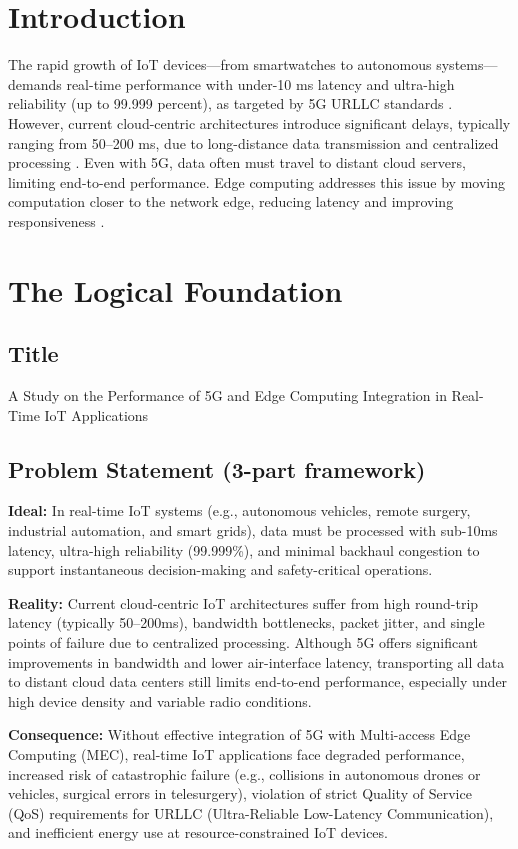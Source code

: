 \documentclass[12pt,a4paper]{article}
\begin{document}
\section{Introduction}
The rapid growth of IoT devices—from smartwatches to autonomous systems—demands real-time performance with under-10 ms latency and ultra-high reliability (up to 99.999 percent), as targeted by 5G URLLC standards \cite{li2025}. However, current cloud-centric architectures introduce significant delays, typically ranging from 50–200 ms, due to long-distance data transmission and centralized processing \cite{chen2022}. Even with 5G, data often must travel to distant cloud servers, limiting end-to-end performance. Edge computing addresses this issue by moving computation closer to the network edge, reducing latency and improving responsiveness \cite{kumar2024, patel2025}.

\section{The Logical Foundation}

\subsection{Title}
A Study on the Performance of 5G and Edge Computing Integration in Real-Time IoT Applications

\subsection{Problem Statement (3-part framework)}
\textbf{Ideal:} In real-time IoT systems (e.g., autonomous vehicles, remote surgery, industrial automation, and smart grids), data must be processed with sub-10ms latency, ultra-high reliability (99.999\%), and minimal backhaul congestion to support instantaneous decision-making and safety-critical operations.

\textbf{Reality:} Current cloud-centric IoT architectures suffer from high round-trip latency (typically 50–200ms), bandwidth bottlenecks, packet jitter, and single points of failure due to centralized processing. Although 5G offers significant improvements in bandwidth and lower air-interface latency, transporting all data to distant cloud data centers still limits end-to-end performance, especially under high device density and variable radio conditions.

\textbf{Consequence:} Without effective integration of 5G with Multi-access Edge Computing (MEC), real-time IoT applications face degraded performance, increased risk of catastrophic failure (e.g., collisions in autonomous drones or vehicles, surgical errors in telesurgery), violation of strict Quality of Service (QoS) requirements for URLLC (Ultra-Reliable Low-Latency Communication), and inefficient energy use at resource-constrained IoT devices.
\end{document}
